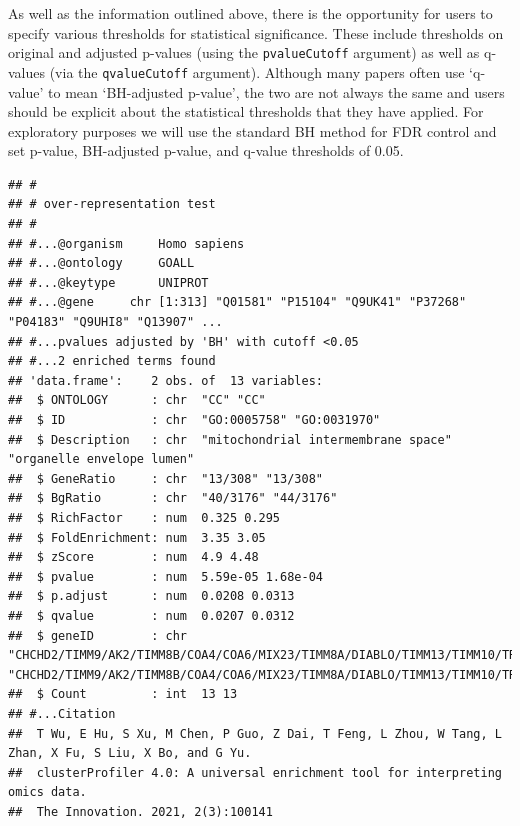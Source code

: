 \documentclass[9pt,a4paper,]{extarticle}
\newenvironment{Shaded}{\begin{snugshade}}{\end{snugshade}}
\newcommand{\AttributeTok}[1]{\textcolor[rgb]{0.13,0.29,0.53}{#1}}
\newcommand{\ConstantTok}[1]{\textcolor[rgb]{0.56,0.35,0.01}{#1}}
\newcommand{\DocumentationTok}[1]{\textcolor[rgb]{0.56,0.35,0.01}{\textbf{\textit{#1}}}}
\newcommand{\FloatTok}[1]{\textcolor[rgb]{0.00,0.00,0.81}{#1}}
\newcommand{\FunctionTok}[1]{\textcolor[rgb]{0.13,0.29,0.53}{\textbf{#1}}}
\newcommand{\NormalTok}[1]{#1}
\newcommand{\OtherTok}[1]{\textcolor[rgb]{0.56,0.35,0.01}{#1}}
\newcommand{\SpecialCharTok}[1]{\textcolor[rgb]{0.81,0.36,0.00}{\textbf{#1}}}
\newcommand{\StringTok}[1]{\textcolor[rgb]{0.31,0.60,0.02}{#1}}
\begin{document}
As well as the information outlined above, there is the opportunity for users to
specify various thresholds for statistical significance. These include
thresholds on original and adjusted p-values (using the \texttt{pvalueCutoff} argument)
as well as q-values (via the \texttt{qvalueCutoff} argument). Although many papers
often use `q- value' to mean `BH-adjusted p-value', the two are not always the
same and users should be explicit about the statistical thresholds that they
have applied. For exploratory purposes we will use the standard BH method for
FDR control and set p-value, BH-adjusted p-value, and q-value thresholds of
0.05.

\begin{Shaded}
\end{Shaded}

\begin{verbatim}
## #
## # over-representation test
## #
## #...@organism     Homo sapiens 
## #...@ontology     GOALL 
## #...@keytype      UNIPROT 
## #...@gene     chr [1:313] "Q01581" "P15104" "Q9UK41" "P37268" "P04183" "Q9UHI8" "Q13907" ...
## #...pvalues adjusted by 'BH' with cutoff <0.05 
## #...2 enriched terms found
## 'data.frame':    2 obs. of  13 variables:
##  $ ONTOLOGY      : chr  "CC" "CC"
##  $ ID            : chr  "GO:0005758" "GO:0031970"
##  $ Description   : chr  "mitochondrial intermembrane space" "organelle envelope lumen"
##  $ GeneRatio     : chr  "13/308" "13/308"
##  $ BgRatio       : chr  "40/3176" "44/3176"
##  $ RichFactor    : num  0.325 0.295
##  $ FoldEnrichment: num  3.35 3.05
##  $ zScore        : num  4.9 4.48
##  $ pvalue        : num  5.59e-05 1.68e-04
##  $ p.adjust      : num  0.0208 0.0313
##  $ qvalue        : num  0.0207 0.0312
##  $ geneID        : chr  "CHCHD2/TIMM9/AK2/TIMM8B/COA4/COA6/MIX23/TIMM8A/DIABLO/TIMM13/TIMM10/TRIAP1/CYCS" "CHCHD2/TIMM9/AK2/TIMM8B/COA4/COA6/MIX23/TIMM8A/DIABLO/TIMM13/TIMM10/TRIAP1/CYCS"
##  $ Count         : int  13 13
## #...Citation
##  T Wu, E Hu, S Xu, M Chen, P Guo, Z Dai, T Feng, L Zhou, W Tang, L Zhan, X Fu, S Liu, X Bo, and G Yu.
##  clusterProfiler 4.0: A universal enrichment tool for interpreting omics data.
##  The Innovation. 2021, 2(3):100141
\end{verbatim}
\end{document}

